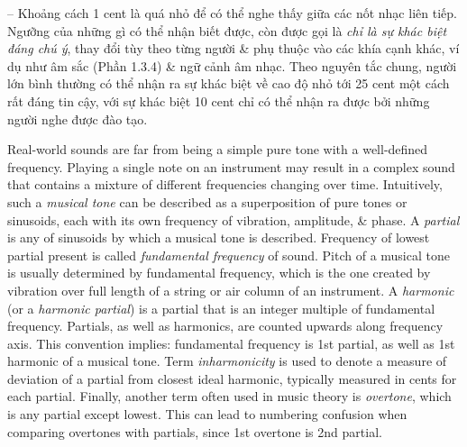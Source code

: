 \documentclass{article}
\begin{document}
\begin{itemize}
\begin{itemize}
\begin{itemize}
			-- Khoảng cách 1 cent là quá nhỏ để có thể nghe thấy giữa các nốt nhạc liên tiếp. Ngưỡng của những gì có thể nhận biết được, còn được gọi là {\it chỉ là sự khác biệt đáng chú ý}, thay đổi tùy theo từng người \& phụ thuộc vào các khía cạnh khác, ví dụ như âm sắc (Phần 1.3.4) \& ngữ cảnh âm nhạc. Theo nguyên tắc chung, người lớn bình thường có thể nhận ra sự khác biệt về cao độ nhỏ tới 25 cent một cách rất đáng tin cậy, với sự khác biệt 10 cent chỉ có thể nhận ra được bởi những người nghe được đào tạo.			
			
			Real-world sounds are far from being a simple pure tone with a well-defined frequency. Playing a single note on an instrument may result in a complex sound that contains a mixture of different frequencies changing over time. Intuitively, such a {\it musical tone} can be described as a superposition of pure tones or sinusoids, each with its own frequency of vibration, amplitude, \& phase. A {\it partial} is any of sinusoids by which a musical tone is described. Frequency of lowest partial present is called {\it fundamental frequency} of sound. Pitch of a musical tone is usually determined by fundamental frequency, which is the one created by vibration over full length of a string or air column of an instrument. A {\it harmonic} (or a {\it harmonic partial}) is a partial that is an integer multiple of fundamental frequency. Partials, as well as harmonics, are counted upwards along frequency axis. This convention implies: fundamental frequency is 1st partial, as well as 1st harmonic of a musical tone. Term {\it inharmonicity} is used to denote a measure of deviation of a partial from closest ideal harmonic, typically measured in cents for each partial. Finally, another term often used in music theory is {\it overtone}, which is any partial except lowest. This can lead to numbering confusion when comparing overtones with partials, since 1st overtone is 2nd partial.
			

\end{itemize}
\end{itemize}
\end{itemize}
\end{document}
